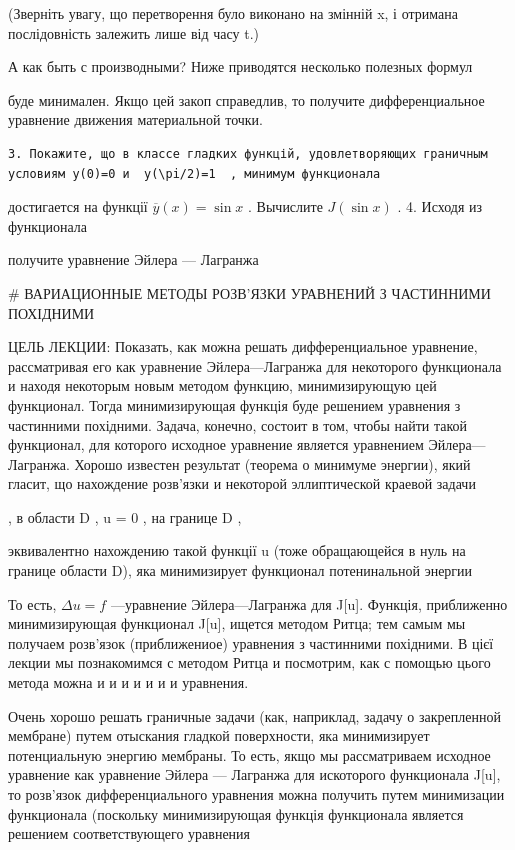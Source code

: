 \documentclass[
  ukrainian,
]{article}
\begin{document}
(Зверніть увагу, що перетворення було виконано на змінній x, і отримана
послідовність залежить лише від часу t.)

А как быть с производными? Ниже приводятся несколько полезных формул

буде минимален. Якщо цей закоп справедлив, то получите дифференциальное
уравнение движения материальной точки.

\begin{verbatim}
3. Покажите, що в классе гладких функцій, удовлетворяющих граничным условиям y(0)=0 и  y(\pi/2)=1  , минимум функционала
\end{verbatim}

достигается на функції \(\overline{y}(x) = \sin x\) . Вычислите
\(J(\sin x)\) . 4. Исходя из функционала

получите уравнение Эйлера --- Лагранжа

\# ВАРИАЦИОННЫЕ МЕТОДЫ РОЗВ'ЯЗКИ УРАВНЕНИЙ З ЧАСТИННИМИ ПОХІДНИМИ

ЦЕЛЬ ЛЕКЦИИ: Показать, как можна решать дифференциальное уравнение,
рассматривая его как уравнение Эйлера---Лагранжа для некоторого
функционала и находя некоторым новым методом функцию, минимизирующую цей
функционал. Тогда минимизирующая функція буде решением уравнения з
частинними похідними. Задача, конечно, состоит в том, чтобы найти такой
функционал, для которого исходное уравнение является уравнением
Эйлера---Лагранжа. Хорошо известен результат (теорема о минимуме
энергии), який гласит, що нахождение розв'язки и некоторой эллиптической
краевой задачи

, в области D , u = 0 , на границе D ,

эквивалентно нахождению такой функції u (тоже обращающейся в нуль на
границе области D), яка минимизирует функционал потенинальной энергии

То есть, \(\Delta u = f\) ---уравнение Эйлера---Лагранжа для J{[}u{]}.
Функція, приближенно минимизирующая функционал J{[}u{]}, ищется методом
Ритца; тем самым мы получаем розв'язок (приближениое) уравнения з
частинними похідними. В цієї лекции мы познакомимся с методом Ритца и
посмотрим, как с помощью цього метода можна и и и и и и и уравнения.

Очень хорошо решать граничные задачи (как, наприклад, задачу о
закрепленной мембране) путем отыскания гладкой поверхности, яка
минимизирует потенциальную энергию мембраны. То есть, якщо мы
рассматриваем исходное уравнение как уравнение Эйлера --- Лагранжа для
искоторого функционала J{[}u{]}, то розв'язок дифференциального
уравнения можна получить путем минимизации функционала (поскольку
минимизирующая функція функционала является решением соответствующего
уравнения
\end{document}
